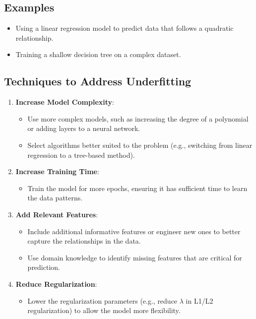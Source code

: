 \subsection*{Examples}
\begin{itemize}
    \item Using a linear regression model to predict data that follows a quadratic relationship.
    \item Training a shallow decision tree on a complex dataset.
\end{itemize}

\subsection*{Techniques to Address Underfitting}
\begin{enumerate}
    \item \textbf{Increase Model Complexity}:
    \begin{itemize}
        \item Use more complex models, such as increasing the degree of a polynomial or adding layers to a neural network.
        \item Select algorithms better suited to the problem (e.g., switching from linear regression to a tree-based method).
    \end{itemize}

    \item \textbf{Increase Training Time}:
    \begin{itemize}
        \item Train the model for more epochs, ensuring it has sufficient time to learn the data patterns.
    \end{itemize}

    \item \textbf{Add Relevant Features}:
    \begin{itemize}
        \item Include additional informative features or engineer new ones to better capture the relationships in the data.
        \item Use domain knowledge to identify missing features that are critical for prediction.
    \end{itemize}

    \item \textbf{Reduce Regularization}:
    \begin{itemize}
        \item Lower the regularization parameters (e.g., reduce $\lambda$ in L1/L2 regularization) to allow the model more flexibility.
    \end{itemize}


\end{enumerate}
